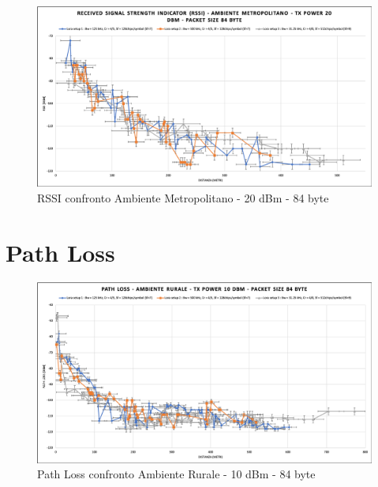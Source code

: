 \documentclass[12pt,a4paper,openright,twoside]{report}
\begin{document}
\begin{figure}[h]                      
\begin{center} 
\includegraphics[width=\textwidth]{RSSI_confronto_AM-20dBm-84byte.png}
\caption[RSSI confronto Ambiente Metropolitano - 20 dBm - 84 byte]{RSSI confronto Ambiente Metropolitano - 20 dBm - 84 byte}\label{fig:prima}
\end{center}
\end{figure}

\section{Path Loss}
\begin{figure}[h]                      
\begin{center} 
\includegraphics[width=\textwidth]{PATH_LOSS_confronto_AR_10dBm_84byte.png}
\caption[Path Loss confronto Ambiente Rurale - 10 dBm - 84 byte]{Path Loss confronto Ambiente Rurale - 10 dBm - 84 byte}\label{fig:prima}
\end{center}
\end{figure}
\end{document}
